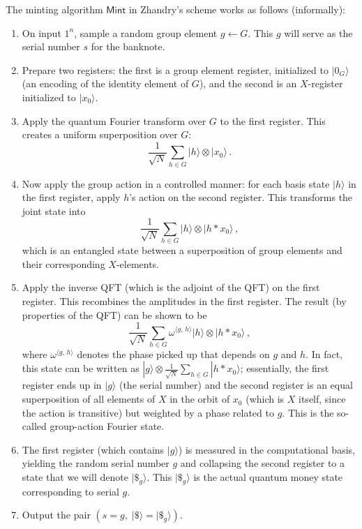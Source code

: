 \documentclass[12pt]{report}
\begin{document}
The minting algorithm $\mathsf{Mint}$ in Zhandry’s scheme works as follows (informally):
\begin{enumerate}
    \item On input $1^n$, sample a random group element $g \leftarrow G$. This $g$ will serve as the serial number $s$ for the banknote.
    \item Prepare two registers: the first is a group element register, initialized to $|0_G\rangle$ (an encoding of the identity element of $G$), and the second is an $X$-register initialized to $|x_0\rangle$.
    \item Apply the quantum Fourier transform over $G$ to the first register. This creates a uniform superposition over $G$: 
    \[
    \frac{1}{\sqrt{N}} \sum_{h \in G} |h\rangle \otimes |x_0\rangle\,.
    \] 
    \item Now apply the group action in a controlled manner: for each basis state $|h\rangle$ in the first register, apply $h$’s action on the second register. This transforms the joint state into 
    \[
    \frac{1}{\sqrt{N}} \sum_{h \in G} |h\rangle \otimes |h * x_0\rangle\,,
    \] 
    which is an entangled state between a superposition of group elements and their corresponding $X$-elements.
    \item Apply the inverse QFT (which is the adjoint of the QFT) on the first register. This recombines the amplitudes in the first register. The result (by properties of the QFT) can be shown to be 
    \[
    \frac{1}{\sqrt{N}} \sum_{h \in G} \omega^{\langle g,\,h \rangle} |h\rangle \otimes |h * x_0\rangle\,,
    \] 
    where $\omega^{\langle g,\,h \rangle}$ denotes the phase picked up that depends on $g$ and $h$. In fact, this state can be written as $|g\rangle \otimes \frac{1}{\sqrt{N}}\sum_{h \in G} |h * x_0\rangle$; essentially, the first register ends up in $|g\rangle$ (the serial number) and the second register is an equal superposition of all elements of $X$ in the orbit of $x_0$ (which is $X$ itself, since the action is transitive) but weighted by a phase related to $g$. This is the so-called group-action Fourier state.
    \item The first register (which contains $|g\rangle$) is measured in the computational basis, yielding the random serial number $g$ and collapsing the second register to a state that we will denote $|\$_g\rangle$. This $|\$_g\rangle$ is the actual quantum money state corresponding to serial $g$.
    \item Output the pair $(s = g,\; |\$\rangle = |\$_g\rangle)$.
\end{enumerate}
\end{document}
